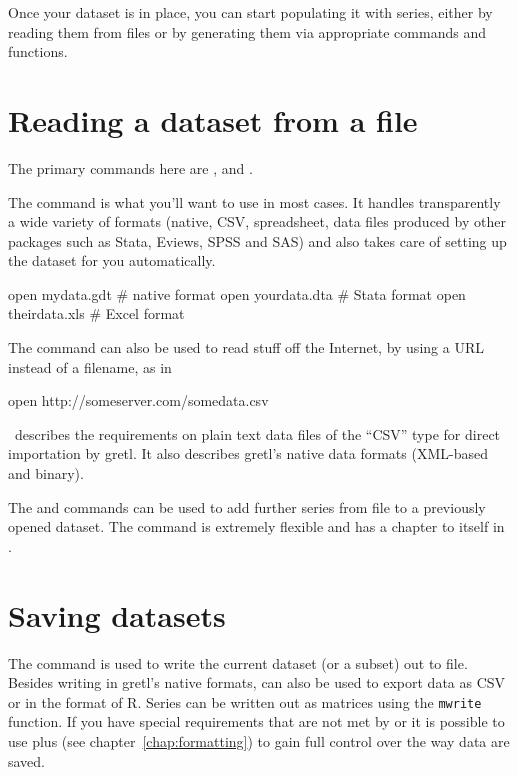 Once your dataset is in place, you can start populating it with
series, either by reading them from files or by generating them via
appropriate commands and functions.

\section{Reading a dataset from a file}

The primary commands here are ,  and .

The  command is what you'll want to use in most cases. It
handles transparently a wide variety of formats (native, CSV,
spreadsheet, data files produced by other packages such as
\textsf{Stata}, \textsf{Eviews}, \textsf{SPSS} and \textsf{SAS}) and
also takes care of setting up the dataset for you automatically.
\begin{code}
  open mydata.gdt    # native format
  open yourdata.dta  # Stata format
  open theirdata.xls # Excel format
\end{code}

The  command can also be used to read stuff off the
Internet, by using a URL instead of a filename, as in
\begin{code}
  open http://someserver.com/somedata.csv
\end{code}

\GUG\ describes the requirements on plain text data files of the
``CSV'' type for direct importation by gretl. It also describes
gretl's native data formats (XML-based and binary).

The  and  commands can be used to add further
series from file to a previously opened dataset. The 
command is extremely flexible and has a chapter to itself in
\GUG.

\section{Saving datasets}

The  command is used to write the current dataset (or a
subset) out to file. Besides writing in gretl's native formats,
 can also be used to export data as CSV or in the format of
\textsf{R}. Series can be written out as matrices using the
\texttt{mwrite} function. If you have special requirements that are
not met by  or  it is possible to use
 plus  (see chapter~\ref{chap:formatting})
to gain full control over the way data are saved.


